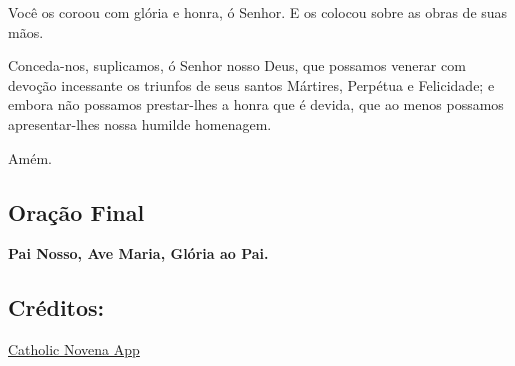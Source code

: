 \documentclass[18pt]{article}
\begin{document}
\begin{justify}
Você os coroou com glória e honra, ó Senhor.  
E os colocou sobre as obras de suas mãos.

Conceda-nos, suplicamos, ó Senhor nosso Deus, que possamos venerar com devoção incessante os triunfos de seus santos Mártires, Perpétua e Felicidade; e embora não possamos prestar-lhes a honra que é devida, que ao menos possamos apresentar-lhes nossa humilde homenagem.

Amém.



\subsection{Oração Final}\label{sec:Oração_Final} %
\begin{center}
\textbf{Pai Nosso, Ave Maria, Glória ao Pai.}


\vfill
\subsection*{Créditos:}
\href{https://catholicnovenaapp.com/novenas/sts-perpetua-and-felicity-novena/#day-1-prayer}{Catholic Novena App}

\end{center}


\end{justify}
\end{document}

